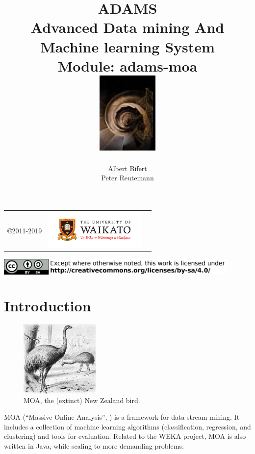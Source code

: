 \documentclass[a4paper]{book}
\title{
  \textbf{ADAMS} \\
  {\Large \textbf{A}dvanced \textbf{D}ata mining \textbf{A}nd \textbf{M}achine
  learning \textbf{S}ystem} \\
  {\Large Module: adams-moa} \\
  \vspace{1cm}
  \includegraphics[width=3cm]{images/moa_logo.png} \\
}
\author{
  Albert Bifert \\
  Peter Reutemann
}
\begin{document}
\begin{titlepage}
\maketitle

\thispagestyle{empty}
\center
\begin{table}[b]
	\begin{tabular}{c l l}
		\parbox[c][2cm]{2cm}{\copyright 2011-2019} &
		\parbox[c][2cm]{5cm}{\includegraphics[width=5cm]{images/coat_of_arms.pdf}} \\
	\end{tabular}
	\includegraphics[width=12cm]{images/cc.png} \\
\end{table}

\end{titlepage}

\tableofcontents
\listoffigures

\chapter{Introduction}

\begin{figure}
  \vspace{-20pt}
  \centering
  \includegraphics[width=0.35\textwidth]{images/moa-bird.png}
  \caption{MOA, the (extinct) New Zealand bird.}
  \label{moa-bird}
\end{figure}  

MOA (``Massive Online Analysis'', \cite{moa}) is a framework for data stream mining. It 
includes a collection of machine learning algorithms (classification, 
regression, and clustering) and tools for evaluation. Related to the WEKA 
project, MOA is also written in Java, while scaling to more demanding problems.
\end{document}
